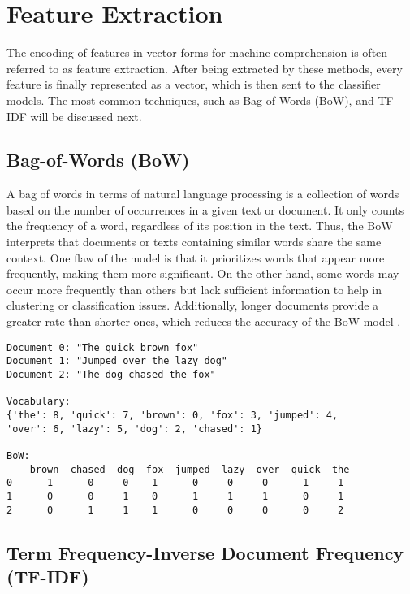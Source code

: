 \section{Feature Extraction}

The encoding of features in vector forms for machine comprehension is often referred to as feature extraction. After being extracted by these methods, every feature is finally represented as a vector, which is then sent to the classifier models. The most common techniques, such as Bag-of-Words (BoW), and TF-IDF will be discussed next.

\subsection{Bag-of-Words (BoW)}

A bag of words in terms of natural language processing is a collection of words based on the number of occurrences in a given text or document. It only counts the frequency of a word, regardless of its position in the text. Thus, the BoW interprets that documents or texts containing similar words share the same context. One flaw of the model is that it prioritizes words that appear more frequently, making them more significant. On the other hand, some words may occur more frequently than others but lack sufficient information to help in clustering or classification issues. Additionally, longer documents provide a greater rate than shorter ones, which reduces the accuracy of the BoW model \citep{tabassum_survey_2020}.

\begin{verbatim}
Document 0: "The quick brown fox"
Document 1: "Jumped over the lazy dog"
Document 2: "The dog chased the fox"

Vocabulary: 
{'the': 8, 'quick': 7, 'brown': 0, 'fox': 3, 'jumped': 4,
'over': 6, 'lazy': 5, 'dog': 2, 'chased': 1}

BoW:
    brown  chased  dog  fox  jumped  lazy  over  quick  the
0      1      0     0    1      0     0     0      1     1
1      0      0     1    0      1     1     1      0     1
2      0      1     1    1      0     0     0      0     2
\end{verbatim}


\subsection{Term Frequency-Inverse Document Frequency (TF-IDF)}

